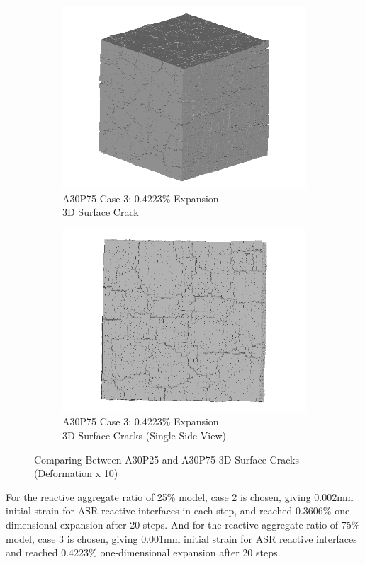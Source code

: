 \begin{figure}[ht!]
\begin{subfigure}{.5\textwidth}
    \end{subfigure}
    \begin{subfigure}{.5\textwidth}
      \centering
      \includegraphics[width=.8\linewidth]{Files/exp_3D/ASR/A30P75_3_3d.png}
    \caption{A30P75 Case 3: 0.4223\% Expansion\\ 3D Surface Crack}
    \end{subfigure}%
    \begin{subfigure}{.5\textwidth}
      \centering
      \includegraphics[width=.8\linewidth]{Files/exp_3D/ASR/A30P75_3_3ds.png}
    \caption{A30P75 Case 3: 0.4223\% Expansion\\ 3D Surface Cracks (Single Side View)}
    \end{subfigure}

  \caption{Comparing Between A30P25 and A30P75 3D Surface Cracks (Deformation x 10)}
  \label{fig:ASR_A30P25vsA30P75_3D}
\end{figure}


For the reactive aggregate ratio of 25\% model, case 2 is chosen, giving 0.002mm initial strain for ASR reactive interfaces in each step, and reached 0.3606\% one-dimensional expansion after 20 steps. And for the reactive aggregate ratio of 75\% model, case 3 is chosen, giving 0.001mm initial strain for ASR reactive interfaces and reached 0.4223\% one-dimensional expansion after 20 steps.

